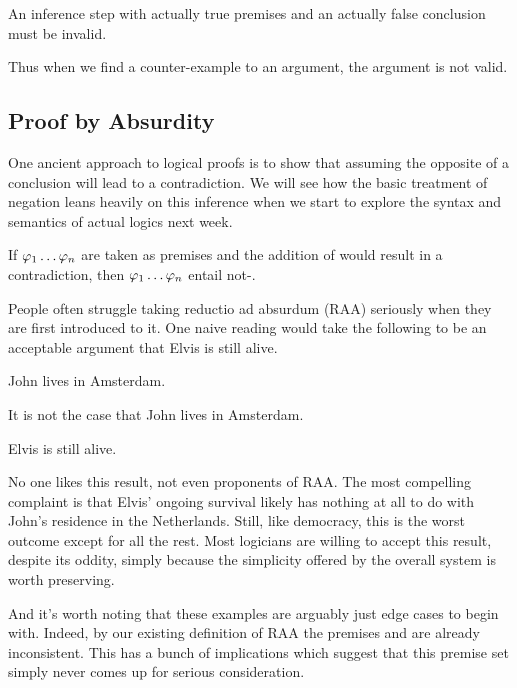 \begin{definition}
  \label{def:invalidity-principle}
  An inference step with actually true premises and an actually false conclusion
  must be invalid.  
\end{definition}

Thus when we find a counter-example to an argument, the argument is not valid.

\subsection{Proof by Absurdity}

One ancient approach to logical proofs is to show that assuming the opposite of
a conclusion will lead to a contradiction. We will see how the basic treatment
of negation leans heavily on this inference when we start to explore the syntax
and semantics of actual logics next week.

\begin{definition}
  \label{def:raa}
  If $\varphi_1\dots\varphi_n$ are taken as premises and the addition of \spsi
  would result in a contradiction, then $\varphi_1\dots\varphi_n$ entail not-\epsi.
\end{definition}

People often struggle taking reductio ad absurdum (RAA) seriously when they are
first introduced to it. One naive reading would take the following to be an
acceptable argument that Elvis is still alive.

\begin{argument}
  \item[ ] John lives in Amsterdam.
  \item[ ] It is not the case that John lives in Amsterdam.
  \item[\therefore] Elvis is still alive.
\end{argument}

No one likes this result, not even proponents of RAA. The most compelling
complaint is that Elvis' ongoing survival likely has nothing at all to do with
John's residence in the Netherlands. Still, like democracy, this is the worst
outcome except for all the rest. Most logicians are willing to accept this
result, despite its oddity, simply because the simplicity offered by the
overall system is worth preserving.

And it's worth noting that these examples are arguably just edge cases to begin
with. Indeed, by our existing definition of RAA the premises \sphi and
\enot\sphi are already inconsistent. This has a bunch of implications which
suggest that this premise set simply never comes up for serious consideration.

